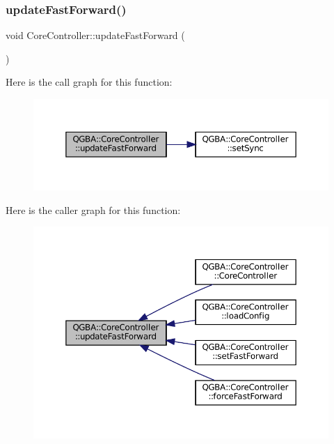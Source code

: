 \subsubsection{\texorpdfstring{update\+Fast\+Forward()}{updateFastForward()}}
{\footnotesize\ttfamily void Core\+Controller\+::update\+Fast\+Forward (\begin{DoxyParamCaption}{ }\end{DoxyParamCaption})\hspace{0.3cm}{\ttfamily [private]}}

Here is the call graph for this function\+:
\nopagebreak
\begin{figure}[H]
\begin{center}
\leavevmode
\includegraphics[width=350pt]{class_q_g_b_a_1_1_core_controller_a074cf60b510439d4e813c60f34829334_cgraph}
\end{center}
\end{figure}
Here is the caller graph for this function\+:
\nopagebreak
\begin{figure}[H]
\begin{center}
\leavevmode
\includegraphics[width=350pt]{class_q_g_b_a_1_1_core_controller_a074cf60b510439d4e813c60f34829334_icgraph}
\end{center}
\end{figure}
\mbox{\label{class_q_g_b_a_1_1_core_controller_a1148fb5411b200cf1c5f67bfc7055eab}} 
